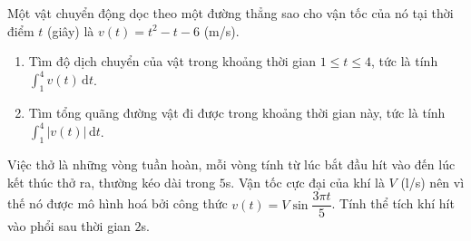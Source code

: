 \begin{bt}%
	Một vật chuyển động dọc theo một đường thẳng sao cho vận tốc của nó  tại thời điểm $t$ (giây) là $v(t)=t^2-t-6$ (m/s).
	\begin{enumerate}
		\item Tìm độ dịch chuyển của vật trong  khoảng thời gian $1\leq t \leq 4$, tức là tính $\displaystyle\int_1^4v(t) \mathrm{\,d
		 }t$.
		\item Tìm tổng quãng đường  vật đi được trong khoảng thời gian này, tức là tính $\displaystyle\int_1^4|v(t)|\mathrm{\,d
		 }t$.
	\end{enumerate}
\end{bt}

\begin{bt}%
	Việc thở là những vòng tuần hoàn, mỗi vòng tính từ lúc bắt đầu hít vào đến lúc kết thúc thở ra, thường kéo dài trong $5$s. Vận tốc cực đại của khí là $V$  (l/s) nên vì thế nó được mô hình hoá bởi công thức $v(t)=V\sin \dfrac{3\pi t}{5}$. Tính thể tích khí hít vào phổi sau thời gian $2$s.
\end{bt}

